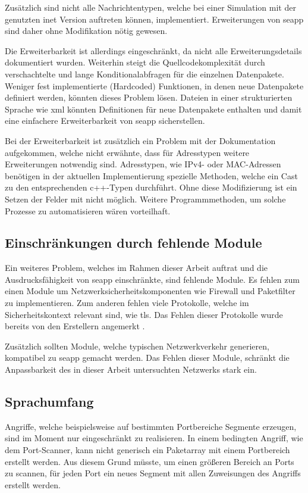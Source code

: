 Zusätzlich sind nicht alle Nachrichtentypen, welche bei einer Simulation mit der genutzten \gls{inet} Version auftreten können, implementiert. Erweiterungen von \gls{seapp} sind daher ohne Modifikation nötig gewesen.

Die Erweiterbarkeit ist allerdings eingeschränkt, da nicht alle Erweiterungsdetails dokumentiert wurden. Weiterhin steigt die Quellcodekomplexität durch verschachtelte und lange Konditionalabfragen für die einzelnen Datenpakete. Weniger fest implementierte (Hardcoded) Funktionen, in denen neue Datenpakete definiert werden, könnten dieses Problem lösen. Dateien in einer strukturierten Sprache wie \gls{xml} könnten Definitionen für neue Datenpakete enthalten und damit eine einfachere Erweiterbarkeit von \gls{seapp} sicherstellen.

Bei der Erweiterbarkeit ist zusätzlich ein Problem mit der Dokumentation aufgekommen, welche nicht erwähnte, dass für Adresstypen weitere Erweiterungen notwendig sind. Adresstypen, wie IPv4- oder MAC-Adressen benötigen in der aktuellen Implementierung spezielle Methoden, welche ein Cast zu den entsprechenden \gls{c++}-Typen durchführt. Ohne diese Modifizierung ist ein Setzen der Felder mit  nicht möglich. Weitere Programmmethoden, um solche Prozesse zu automatisieren wären vorteilhaft.

\subsection{Einschränkungen durch fehlende Module}\label{aus:fehlendeModule}
Ein weiteres Problem, welches im Rahmen dieser Arbeit auftrat und die Ausdrucksfähigkeit von \gls{seapp} einschränkte, sind fehlende Module. Es fehlen zum einen Module  um Netzwerksicherheitskomponenten wie \zB Firewall und Paketfilter zu implementieren. Zum anderen fehlen viele Protokolle, welche im Sicherheitskontext relevant sind, wie \zB \gls{tls}. Das Fehlen dieser Protokolle wurde bereits von den Erstellern angemerkt \cite[]{Tiloca2019}. 

Zusätzlich sollten Module, welche typischen Netzwerkverkehr generieren, kompatibel zu \gls{seapp} gemacht werden. Das Fehlen dieser Module, schränkt die Anpassbarkeit des in dieser Arbeit untersuchten Netzwerks stark ein.

\subsection{Sprachumfang}\label{aus:Sprachumfang}
Angriffe, welche beispielsweise auf bestimmten Portbereiche Segmente erzeugen, sind im Moment nur eingeschränkt zu realisieren. In einem bedingten Angriff, wie dem Port-Scanner, kann nicht generisch ein Paketarray mit einem Portbereich erstellt werden. Aus diesem Grund müsste, um einen größeren Bereich an Ports zu scannen, für jeden Port ein neues Segment mit allen Zuweisungen des Angriffs erstellt werden.

